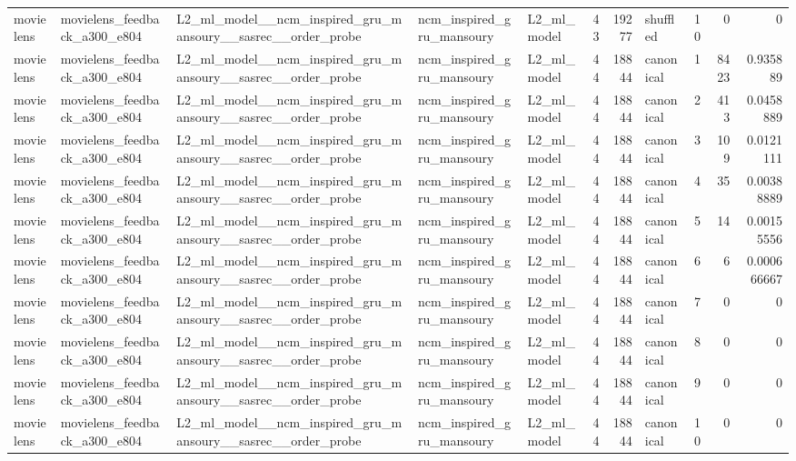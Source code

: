 \begin{table}[htbp!]
\begin{tabular}{lllllrrlrrr}
movielens & movielens\_feedback\_a300\_e804 & L2\_ml\_model\_\_ncm\_inspired\_gru\_mansoury\_\_sasrec\_\_order\_probe & ncm\_inspired\_gru\_mansoury & L2\_ml\_model & 43 & 19277 & shuffled & 10 & 0 & 0 \\
movielens & movielens\_feedback\_a300\_e804 & L2\_ml\_model\_\_ncm\_inspired\_gru\_mansoury\_\_sasrec\_\_order\_probe & ncm\_inspired\_gru\_mansoury & L2\_ml\_model & 44 & 18844 & canonical & 1 & 8423 & 0.935889 \\
movielens & movielens\_feedback\_a300\_e804 & L2\_ml\_model\_\_ncm\_inspired\_gru\_mansoury\_\_sasrec\_\_order\_probe & ncm\_inspired\_gru\_mansoury & L2\_ml\_model & 44 & 18844 & canonical & 2 & 413 & 0.0458889 \\
movielens & movielens\_feedback\_a300\_e804 & L2\_ml\_model\_\_ncm\_inspired\_gru\_mansoury\_\_sasrec\_\_order\_probe & ncm\_inspired\_gru\_mansoury & L2\_ml\_model & 44 & 18844 & canonical & 3 & 109 & 0.0121111 \\
movielens & movielens\_feedback\_a300\_e804 & L2\_ml\_model\_\_ncm\_inspired\_gru\_mansoury\_\_sasrec\_\_order\_probe & ncm\_inspired\_gru\_mansoury & L2\_ml\_model & 44 & 18844 & canonical & 4 & 35 & 0.00388889 \\
movielens & movielens\_feedback\_a300\_e804 & L2\_ml\_model\_\_ncm\_inspired\_gru\_mansoury\_\_sasrec\_\_order\_probe & ncm\_inspired\_gru\_mansoury & L2\_ml\_model & 44 & 18844 & canonical & 5 & 14 & 0.00155556 \\
movielens & movielens\_feedback\_a300\_e804 & L2\_ml\_model\_\_ncm\_inspired\_gru\_mansoury\_\_sasrec\_\_order\_probe & ncm\_inspired\_gru\_mansoury & L2\_ml\_model & 44 & 18844 & canonical & 6 & 6 & 0.000666667 \\
movielens & movielens\_feedback\_a300\_e804 & L2\_ml\_model\_\_ncm\_inspired\_gru\_mansoury\_\_sasrec\_\_order\_probe & ncm\_inspired\_gru\_mansoury & L2\_ml\_model & 44 & 18844 & canonical & 7 & 0 & 0 \\
movielens & movielens\_feedback\_a300\_e804 & L2\_ml\_model\_\_ncm\_inspired\_gru\_mansoury\_\_sasrec\_\_order\_probe & ncm\_inspired\_gru\_mansoury & L2\_ml\_model & 44 & 18844 & canonical & 8 & 0 & 0 \\
movielens & movielens\_feedback\_a300\_e804 & L2\_ml\_model\_\_ncm\_inspired\_gru\_mansoury\_\_sasrec\_\_order\_probe & ncm\_inspired\_gru\_mansoury & L2\_ml\_model & 44 & 18844 & canonical & 9 & 0 & 0 \\
movielens & movielens\_feedback\_a300\_e804 & L2\_ml\_model\_\_ncm\_inspired\_gru\_mansoury\_\_sasrec\_\_order\_probe & ncm\_inspired\_gru\_mansoury & L2\_ml\_model & 44 & 18844 & canonical & 10 & 0 & 0 \\

\end{tabular}
\end{table}
